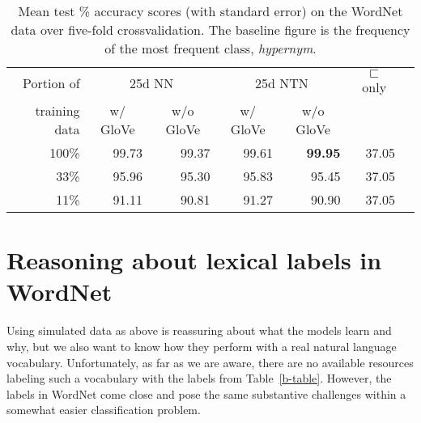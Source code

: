 \documentclass[letterpaper]{article}
\newcommand{\natfor}{\sqsubset}
\def\ii#1{\textit{#1}}
\begin{document}
\newcommand{\nodagger}{\phantom{$^\dagger$}}

\begin{table*}
\centering%
{
  \setlength{\tabcolsep}{15pt}
  \renewcommand{\arraystretch}{1.1}
  \begin{tabular}{rrrrrrr} 
    \toprule
     Portion of & \multicolumn{2}{c}{25d NN} & \multicolumn{2}{c}{25d NTN} & \multicolumn{1}{c}{$\natfor$ only}\\
     training data  & \multicolumn{1}{c}{w/ GloVe} & \multicolumn{1}{c}{w/o GloVe} & \multicolumn{1}{c}{w/ GloVe} & \multicolumn{1}{c}{w/o GloVe} \\
    \midrule
     100\%   & 99.73 & 99.37   & 99.61  & \textbf{99.95}  & 37.05 \\
     33\%    & 95.96 & 95.30    & 95.83  & 95.45  & 37.05 		\\
     11\%    & 91.11 & 90.81   & 91.27  & 90.90  & 37.05 		\\
    \bottomrule
  \end{tabular}}
 \caption{Mean test \% accuracy scores (with standard error) on the WordNet data over five-fold crossvalidation. The baseline figure is the frequency of the most frequent class, \ii{hypernym}.\label{wn-table}} 
\end{table*}

\section{Reasoning about lexical labels in WordNet}\label{sec:wordnet}

Using simulated data as above is reassuring about what the models
learn and why, but we also want to know how they perform with a real
natural language vocabulary. Unfortunately, as far as we are aware,
there are no available resources labeling such a vocabulary with the
labels from Table~\ref{b-table}. However, the labels in WordNet
\cite{fellbaum2010wordnet,WordNet95} come close and pose the same substantive
challenges within a somewhat easier classification problem.

\end{document}

